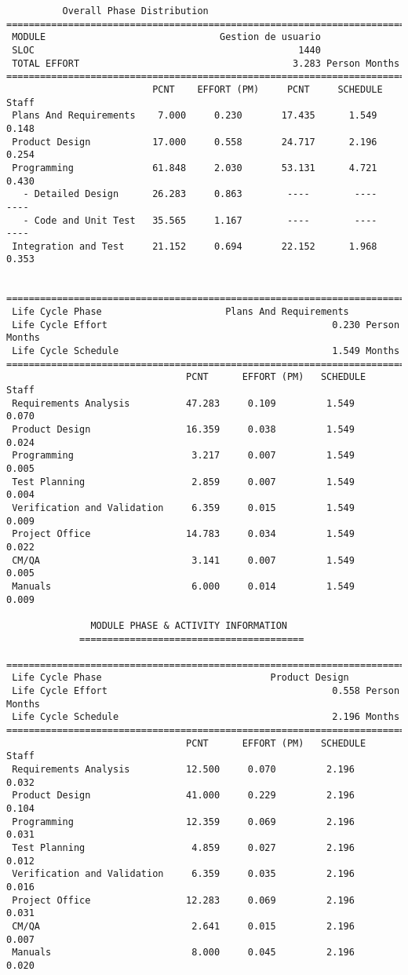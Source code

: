 \documentclass[11pt,a4paper,spanish,twoside]{report}
\begin{document}
{\begin{verbatim}
          Overall Phase Distribution
==============================================================================
 MODULE                               Gestion de usuario
 SLOC                                               1440
 TOTAL EFFORT                                      3.283 Person Months
==============================================================================
                          PCNT    EFFORT (PM)     PCNT     SCHEDULE       Staff
 Plans And Requirements    7.000     0.230       17.435      1.549       0.148
 Product Design           17.000     0.558       24.717      2.196       0.254
 Programming              61.848     2.030       53.131      4.721       0.430
   - Detailed Design      26.283     0.863        ----        ----        ----
   - Code and Unit Test   35.565     1.167        ----        ----        ----
 Integration and Test     21.152     0.694       22.152      1.968       0.353


==============================================================================
 Life Cycle Phase                      Plans And Requirements
 Life Cycle Effort                                        0.230 Person Months
 Life Cycle Schedule                                      1.549 Months
==============================================================================
                                PCNT      EFFORT (PM)   SCHEDULE       Staff   
 Requirements Analysis          47.283     0.109         1.549        0.070
 Product Design                 16.359     0.038         1.549        0.024
 Programming                     3.217     0.007         1.549        0.005
 Test Planning                   2.859     0.007         1.549        0.004
 Verification and Validation     6.359     0.015         1.549        0.009
 Project Office                 14.783     0.034         1.549        0.022
 CM/QA                           3.141     0.007         1.549        0.005
 Manuals                         6.000     0.014         1.549        0.009

		       MODULE PHASE & ACTIVITY INFORMATION
		     ========================================

==============================================================================
 Life Cycle Phase                              Product Design
 Life Cycle Effort                                        0.558 Person Months
 Life Cycle Schedule                                      2.196 Months
==============================================================================
                                PCNT      EFFORT (PM)   SCHEDULE       Staff   
 Requirements Analysis          12.500     0.070         2.196        0.032
 Product Design                 41.000     0.229         2.196        0.104
 Programming                    12.359     0.069         2.196        0.031
 Test Planning                   4.859     0.027         2.196        0.012
 Verification and Validation     6.359     0.035         2.196        0.016
 Project Office                 12.283     0.069         2.196        0.031
 CM/QA                           2.641     0.015         2.196        0.007
 Manuals                         8.000     0.045         2.196        0.020


\end{verbatim}}
\end{document}
